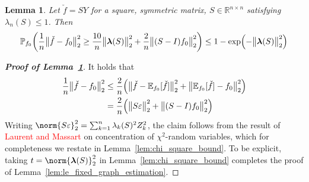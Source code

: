 \documentclass{article}
\newcommand{\Reals}{\mathbb{R}}
\newcommand{\1}{\mathbf{1}}
\newcommand{\lambdavec}{\boldsymbol{\lambda}}
\newcommand{\Pbb}{\mathbb{P}}
\newcommand{\Ebb}{\mathbb{E}}
\theoremstyle{alden}
\theoremstyle{aldenthm}
\newtheorem{lemma}{Lemma}
\theoremstyle{definition}
\theoremstyle{remark}
\begin{document}
\begin{lemma}
	\label{lem:linear_smoother_fixed_graph_estimation}
	Let $\check{f} = SY$ for a square, symmetric matrix, $S \in \Reals^{n \times n}$ satisfying $\lambda_n(S) \leq 1$. Then
	\begin{equation*}
	\Pbb_{f_0}\biggl(\frac{1}{n}\bigl\|\check{f} - f_0\bigr\|_2^2 \geq \frac{10}{n} \bigl\|\lambdavec(S)\bigr\|_2^2 + \frac{2}{n}\bigl\|(S - I)f_0\bigr\|_2^2\biggr) \leq 1 - \exp\Bigl(-\bigl\|\lambdavec(S)\bigr\|_2^2\Bigr)
	\end{equation*}
\end{lemma}
\begin{proof}[\textbf{Proof of Lemma~\ref{lem:linear_smoother_fixed_graph_estimation}}]
	It holds that
	\begin{align*}
	\frac{1}{n}\bigl\|\check{f} - f_0\bigr\|_2^2 & \leq \frac{2}{n}\Bigl(\bigl\|\check{f} - \Ebb_{f_0}[\check{f}]\bigr\|_2^2 + \bigl\|\Ebb_{f_0}[\check{f}] - f_0\bigr\|_2^2\Bigr) \\ 
	& = \frac{2}{n}\Bigl(\bigl\|S\varepsilon\bigr\|_2^2 + \bigl\|(S - I)f_0\bigr\|_2^2\Bigr)
	\end{align*}
	Writing $\norm{S\varepsilon}_2^2 = \sum_{k = 1}^{n} \lambda_k(S)^2 Z_k^2$, the claim follows from the result of \textcolor{red}{Laurent and Massart} on concentration of $\chi^2$-random variables, which for completeness we restate in Lemma~\ref{lem:chi_square_bound}. To be explicit, taking $t = \norm{\lambdavec(S)}_2^2$ in Lemma~\ref{lem:chi_square_bound} completes the proof of Lemma~\ref{lem:le_fixed_graph_estimation}.
\end{proof}
\end{document}
